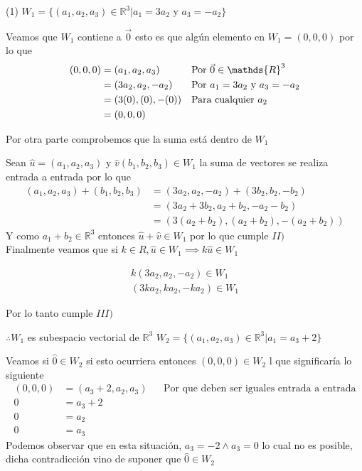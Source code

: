 \documentclass[letterpaper]{article}
\newcommand{\R}{\mathds{R}}
\renewcommand{\*}{\cdot}
\theoremstyle{definition}
\begin{document}
\begin{tasks}(1)
\task $W_{1} = \lbrace (a_{1},a_{2},a_{3}) \in \mathbb{R}^{3} \big\vert  a_{1}=3a_{2}$ y $a_{3}=-a_{2} \rbrace$

Veamos que $ W_{1} $ contiene a $ \vec{0} $ esto es que algún elemento en $ W_{1} = (0,0,0) $ por lo que 
	\begin{align*}
		(0,0,0) &= (a_{1},a_{2},a_{3}) && \text{Por $ \vec{0} \in \R^3 $}\\
		&= (3a_{2},a_{2},-a_{2}) && \text{Por $a_{1}=3a_{2}$ y $a_{3}=-a_{2}$}\\
		&= (3(0),(0),-(0)) && \text{Para cualquier $ a_2 $}\\
		&= (0,0,0)
	\end{align*}
	
Por otra parte comprobemos que la suma está dentro de $ W_1 $ 

Sean $ \hat{u} = (a_{1},a_{2},a_{3})  $ y $\hat{v} (b_{1},b_{2},b_{3})  \in W_1$ la suma de vectores se realiza entrada a entrada por lo que
\begin{align*}
	(a_{1},a_{2},a_{3}) + (b_{1},b_{2},b_{3}) &= (3a_{2},a_{2},-a_{2}) + (3b_{2},b_{2},-b_{2})\\
	&= (3 a_2 + 3b_2, a_2 + b_2, -a_2 - b_2)\\
	&= (3( a_2 + b_2), (a_2 + b_2), -(a_2 +b_2))
\end{align*}
 Y como $ a_1 + b_2 \in \R^3$ entonces $ \hat{u} + \hat{v} \in W_1 $ por lo que cumple $ II) $\\
 
 Finalmente veamos que si $ k \in R, \hat{u} \in W_1 \implies k\hat{u} \in W_1$
 
	\begin{align*}
		k(3a_2, a_2, -a_2) \in W_1\\
		(3ka_2, ka_2, -ka_2) \in W_1
	\end{align*}
	
	Por lo tanto cumple $ III) $ 
	
	$ \therefore W_1  $ es subespacio vectorial de $ \R^3 $
\task $W_{2} = \lbrace (a_{1},a_{2},a_{3}) \in \mathbb{R}^{3} \big\vert  a_{1} = a_{3} + 2 \rbrace$

Veamos si $ \hat{0} \in W_2 $ si esto ocurriera entonces $ (0,0,0)  \in W_2$ l que significaría lo siguiente
\begin{align*}
	(0,0,0) &= (a_3 + 2, a_2, a_3) && \text{Por que deben ser iguales entrada a entrada}\\
	0 &= a_3 + 2\\
	0 &= a_2 \\
	0 &= a_3 
\end{align*}
Podemos observar que en esta situación, $ a_3 = -2 \land a_3 = 0 $ lo cual no es posible, dicha contradicción vino de suponer que $ \hat{0} \in W_2 $


\end{tasks}
\end{document}
